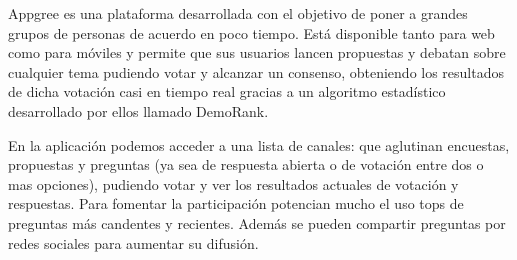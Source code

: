 Appgree\cite{ref:appgree} es una plataforma desarrollada con el objetivo de poner a grandes grupos de personas de acuerdo en poco tiempo. Está disponible tanto para web como para móviles y permite que sus usuarios lancen propuestas y debatan sobre cualquier tema pudiendo votar y alcanzar un consenso, obteniendo los resultados de dicha votación casi en tiempo real gracias a un algoritmo estadístico desarrollado por ellos llamado DemoRank\cite{ref:appgree_demoRank}.

En la aplicación podemos acceder a una lista de canales: que aglutinan encuestas, propuestas y preguntas (ya sea de respuesta abierta o de votación entre dos o mas opciones), pudiendo votar y ver los resultados actuales de votación y respuestas. Para fomentar la participación potencian mucho el uso tops de preguntas más candentes y recientes. Además se pueden compartir preguntas por redes sociales para aumentar su difusión.

